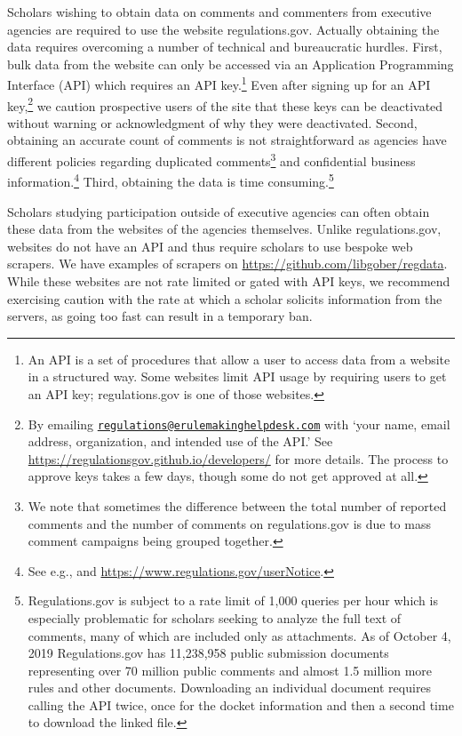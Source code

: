 \documentclass[12pt,notitlepage]{article}
\begin{document}
Scholars wishing to obtain data on comments and commenters from
executive agencies are required to use the website regulations.gov.
Actually obtaining the data requires overcoming a number of technical
and bureaucratic hurdles. First, bulk data from the website can only be
accessed via an Application Programming Interface (API) which requires
an API key.\footnote{An API is a set of procedures that allow a user to
  access data from a website in a structured way. Some websites limit
  API usage by requiring users to get an API key; regulations.gov is one
  of those websites.} Even after signing up for an API key,\footnote{By
  emailing
  \href{mailto:regulations@erulemakinghelpdesk.com}{\nolinkurl{regulations@erulemakinghelpdesk.com}}
  with `your name, email address, organization, and intended use of the
  API.' See \url{https://regulationsgov.github.io/developers/} for more
  details. The process to approve keys takes a few days, though some do
  not get approved at all.} we caution prospective users of the site
that these keys can be deactivated without warning or acknowledgment of
why they were deactivated. Second, obtaining an accurate count of
comments is not straightforward as agencies have different policies
regarding duplicated comments\footnote{We note that sometimes the
  difference between the total number of reported comments and the
  number of comments on regulations.gov is due to mass comment campaigns
  being grouped together.} and confidential business
information.\footnote{See e.g., \citet{Lubbers_2012} and
  \url{https://www.regulations.gov/userNotice}.} Third, obtaining the
data is time consuming.\footnote{Regulations.gov is subject to a rate
  limit of 1,000 queries per hour which is especially problematic for
  scholars seeking to analyze the full text of comments, many of which
  are included only as attachments. As of October 4, 2019
  Regulations.gov has 11,238,958 public submission documents
  representing over 70 million public comments and almost 1.5 million
  more rules and other documents. Downloading an individual document
  requires calling the API twice, once for the docket information and
  then a second time to download the linked file.}

Scholars studying participation outside of executive agencies can often
obtain these data from the websites of the agencies themselves. Unlike
regulations.gov, websites do not have an API and thus require scholars
to use bespoke web scrapers. We have examples of scrapers on
\url{https://github.com/libgober/regdata}. While these websites are not
rate limited or gated with API keys, we recommend exercising caution
with the rate at which a scholar solicits information from the servers,
as going too fast can result in a temporary ban.
\end{document}
